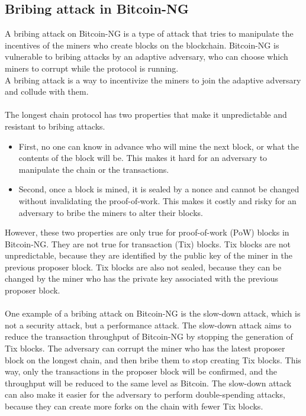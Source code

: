 \documentclass{report}
\begin{document}
\subsection{Bribing attack in Bitcoin-NG}
A bribing attack on Bitcoin-NG is a type of attack that tries to manipulate the incentives of the miners who create blocks on the blockchain.
 Bitcoin-NG is vulnerable to bribing attacks by an adaptive adversary, who can choose which miners to corrupt while the protocol is running.\\
A bribing attack is a way to incentivize the miners to join the adaptive adversary and collude with them.\\\\
The longest chain protocol has two properties that make it unpredictable and resistant to bribing attacks.
\begin{itemize}
	\item First, no one can know in advance who will mine the next block, or what the contents of the block will be. This makes it hard for an adversary to manipulate the chain or the transactions.
	\item Second, once a block is mined, it is sealed by a nonce and cannot be changed without invalidating the proof-of-work. This makes it costly and risky for an adversary to bribe the miners to alter their blocks.
\end{itemize} 
However, these two properties are only true for proof-of-work (PoW) blocks in Bitcoin-NG. They are not true for transaction (Tix) blocks. Tix blocks are not unpredictable, because they are identified by the public key of the miner in the previous proposer block. Tix blocks are also not sealed, because they can be changed by the miner who has the private key associated with the previous proposer block.\\\\
One example of a bribing attack on Bitcoin-NG is the slow-down attack, which is not a security attack, but a performance attack. The slow-down attack aims to reduce the transaction throughput of Bitcoin-NG by stopping the generation of Tix blocks. The adversary can corrupt the miner who has the latest proposer block on the longest chain, and then bribe them to stop creating Tix blocks. This way, only the transactions in the proposer block will be confirmed, and the throughput will be reduced to the same level as Bitcoin. The slow-down attack can also make it easier for the adversary to perform double-spending attacks, because they can create more forks on the chain with fewer Tix blocks.
\end{document}
